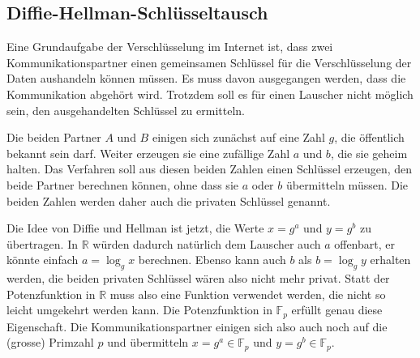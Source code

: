 \subsection{Diffie-Hellman-Schlüsseltausch
\label{buch:subsection:diffie-hellman}}
Eine Grundaufgabe der Verschlüsselung im Internet ist, dass zwei
Kommunikationspartner einen gemeinsamen Schlüssel für die Verschlüsselung
der Daten aushandeln können müssen.
Es muss davon ausgegangen werden, dass die Kommunikation abgehört wird.
Trotzdem soll es für einen Lauscher nicht möglich sein, den 
ausgehandelten Schlüssel zu ermitteln.


Die beiden Partner $A$ und $B$ einigen sich zunächst auf eine Zahl $g$,
die öffentlich bekannt sein darf.
Weiter erzeugen sie eine zufällige Zahl $a$ und $b$, die sie geheim
halten.
Das Verfahren soll aus diesen beiden Zahlen einen Schlüssel erzeugen,
den beide Partner berechnen können, ohne dass sie $a$ oder $b$ 
übermitteln müssen.
Die beiden Zahlen werden daher auch die privaten Schlüssel genannt.

Die Idee von Diffie und Hellman ist jetzt, die Werte $x=g^a$ und $y=g^b$
zu übertragen.
In $\mathbb{R}$ würden dadurch natürlich dem Lauscher auch $a$ offenbart,
er könnte einfach $a=\log_g x$ berechnen.
Ebenso kann auch $b$ als $b=\log_g y$ erhalten werden, die beiden
privaten Schlüssel wären also nicht mehr privat.
Statt der Potenzfunktion in $\mathbb{R}$ muss also eine Funktion
verwendet werden, die nicht so leicht umgekehrt werden kann.
Die Potenzfunktion in $\mathbb{F}_p$ erfüllt genau diese Eigenschaft.
Die Kommunikationspartner einigen sich also auch noch auf die (grosse)
Primzahl $p$ und übermitteln $x=g^a\in\mathbb{F}_p$ und
$y=g^b\in\mathbb{F}_p$.


